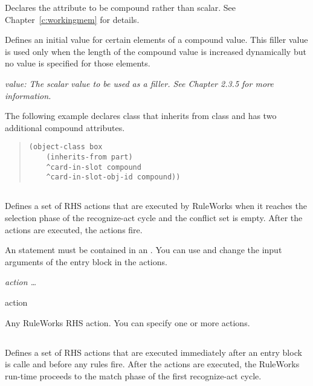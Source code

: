 {{

Declares the attribute to be compound rather than scalar. See
Chapter~\ref{c:workingmem} for details.


Defines an initial value for certain elements of a compound
value. This filler value is used only when the length of the compound
value is increased dynamically but no value is specified for those
elements.

\it{value}: The scalar value to be used as a filler. See Chapter 2.3.5
for more information.

\Example

The following example declares class  that inherits from
class  and has two additional compound attributes.

\begin{quote}
\begin{verbatim}
(object-class box
    (inherits-from part)
    ^card-in-slot compound
    ^card-in-slot-obj-id compound))
\end{verbatim}
\end{quote}

\subsection{}

Defines a set of RHS actions that are executed by RuleWorks
when it reaches the selection phase of the recognize-act
cycle and the conflict set is empty. After the 
actions are executed, the  actions fire.

An  statement must be contained in an .
You can use and change the input arguments of the entry block
in the  actions.

\Format

 \it{action} \ldots

\begin{arguments}
\item[action]

  Any RuleWorks RHS action. You can specify one or more actions.
\end{arguments}

\subsection{}

Defines a set of RHS actions that are executed immediately
after an entry block is calle and before any rules fire.
After the  actions are executed, the RuleWorks
run-time proceeds to the match phase of the first
recognize-act cycle.

}}
